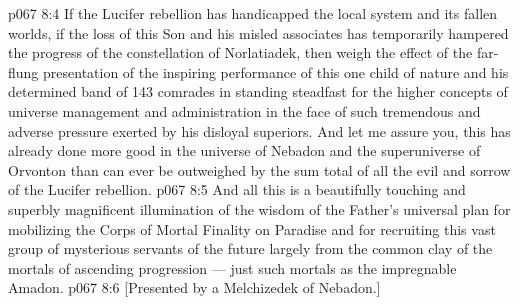 \vs p067 8:4 If the Lucifer rebellion has handicapped the local system and its fallen worlds, if the loss of this Son and his misled associates has temporarily hampered the progress of the constellation of Norlatiadek, then weigh the effect of the far\hyp{}flung presentation of the inspiring performance of this one child of nature and his determined band of 143 comrades in standing steadfast for the higher concepts of universe management and administration in the face of such tremendous and adverse pressure exerted by his disloyal superiors. And let me assure you, this has already done more good in the universe of Nebadon and the superuniverse of Orvonton than can ever be outweighed by the sum total of all the evil and sorrow of the Lucifer rebellion.
\vs p067 8:5 And all this is a beautifully touching and superbly magnificent illumination of the wisdom of the Father’s universal plan for mobilizing the Corps of Mortal Finality on Paradise and for recruiting this vast group of mysterious servants of the future largely from the common clay of the mortals of ascending progression --- just such mortals as the impregnable Amadon.
\vsetoff
\vs p067 8:6 [Presented by a Melchizedek of Nebadon.]
